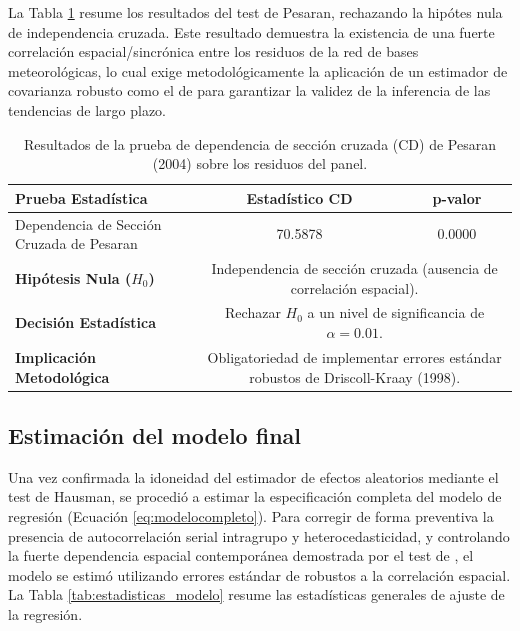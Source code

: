 La Tabla \ref{tab:test_pesaran} resume los resultados del test de Pesaran, rechazando la hipótes nula de independencia cruzada. Este resultado demuestra la existencia de una fuerte correlación espacial/sincrónica entre los residuos de la red de bases meteorológicas, lo cual exige metodológicamente la aplicación de un estimador de covarianza robusto como el de  para garantizar la validez de la inferencia de las tendencias de largo plazo.

\begin{table}[ht!]
\centering
\begin{threeparttable}
\caption{Resultados de la prueba de dependencia de sección cruzada (CD) de Pesaran (2004) sobre los residuos del panel.}
\label{tab:test_pesaran}
\vspace{-0.6cm}
\singlespacing %
\small         %
\begin{tabular}{lcc}
\hline\hline
\textbf{Prueba Estadística} & \textbf{Estadístico CD} & \textbf{p-valor} \\ \hline
Dependencia de Sección Cruzada de Pesaran & 70.5878 & 0.0000 \\ \hline
\textbf{Hipótesis Nula ($H_0$)} & \multicolumn{2}{p{6cm}}{Independencia de sección cruzada (ausencia de correlación espacial).} \\
\textbf{Decisión Estadística} & \multicolumn{2}{p{6cm}}{Rechazar $H_0$ a un nivel de significancia de $\alpha = 0.01$.} \\
\textbf{Implicación Metodológica} & \multicolumn{2}{p{6cm}}{Obligatoriedad de implementar errores estándar robustos de Driscoll-Kraay (1998).} \\ \hline\hline
\end{tabular}
\end{threeparttable}
\end{table}

\subsection{Estimación del modelo final}

Una vez confirmada la idoneidad del estimador de efectos aleatorios mediante el test de Hausman, se procedió a estimar la especificación completa del modelo de regresión (Ecuación \ref{eq:modelocompleto}). Para corregir de forma preventiva la presencia de autocorrelación serial intragrupo y heterocedasticidad, y controlando la fuerte dependencia espacial contemporánea demostrada por el test de , el modelo se estimó utilizando errores estándar de  robustos a la correlación espacial. La Tabla \ref{tab:estadisticas_modelo} resume las estadísticas generales de ajuste de la regresión.

